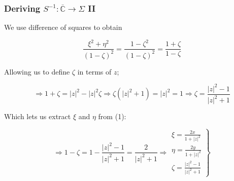 \documentclass[24pt]{beamer}
\begin{document}
\begin{frame}
\frametitle{Deriving $S^{-1}:\overline{\mathbb{C}}\to\Sigma$ II}

We use difference of squares to obtain

\vspace{-5pt}

\[\frac{\xi^2+\eta^2}{(1-\zeta)^2}=\frac{1-\zeta^2}{(1-\zeta)^2}=\frac{1+\zeta}{1-\zeta}\]

\vspace{7pt}

Allowing us to define $\zeta$ in terms of $z$;

\vspace{-25pt}

\[\Rightarrow1+\zeta=|z|^2-|z|^2\zeta\Rightarrow\zeta(|z|^2+1)=|z|^2=1\Rightarrow\boxed{\zeta=\frac{|z|^2-1}{|z|^2+1}}\]

\vspace{-5pt}

Which lets us extract $\xi$ and $\eta$ from (1):

\vspace{-15pt}

\begin{equation}
\Rightarrow1-\zeta=1-\frac{|z|^2-1}{|z|^2+1}=\frac{2}{|z|^2+1}\Rightarrow\left.\begin{aligned}\xi=\frac{2x}{1+|z|^2}\\\eta=\frac{2y}{1+|z|^2}\\\zeta=\frac{|z|^2-1}{|z|^2+1}\end{aligned}\right\}
\end{equation}
\end{frame}
\end{document}
